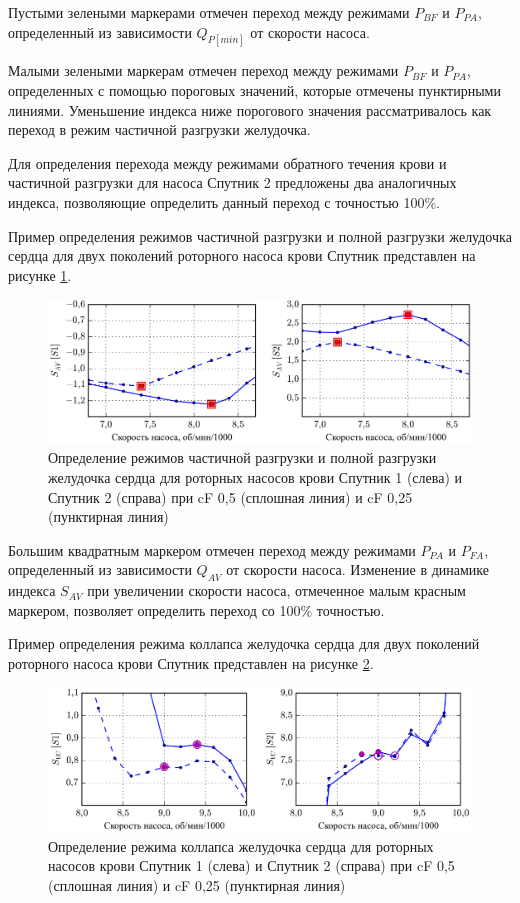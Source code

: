Пустыми зелеными маркерами отмечен переход между режимами $P_{BF}$ и $P_{PA}$, определенный из зависимости $Q_{P[min]}$ от скорости насоса. 

Малыми зелеными маркерам отмечен переход между режимами $P_{BF}$ и $P_{PA}$, определенных с помощью пороговых значений, которые отмечены пунктирными линиями. Уменьшение индекса ниже порогового значения рассматривалось как переход в режим частичной разгрузки желудочка.

Для определения перехода между режимами обратного течения крови и частичной разгрузки для насоса Спутник 2 предложены два аналогичных индекса, позволяющие определить данный переход с точностью 100\%. 

Пример определения режимов частичной разгрузки и полной разгрузки желудочка сердца для двух поколений роторного насоса крови Спутник представлен на рисунке \ref{img:pa_fa_identification}.

\begin{figure}[H] 
  \center
  \includegraphics [scale=1.0] {../images/c4_av}
  \caption{Определение режимов частичной разгрузки и полной разгрузки желудочка сердца для роторных насосов крови Спутник 1 (слева) и Спутник 2 (справа) при cF 0,5 (сплошная линия) и cF 0,25 (пунктирная линия)} 
  \label{img:pa_fa_identification}  
\end{figure}

Большим квадратным маркером отмечен переход между режимами $P_{PA}$ и $P_{FA}$, определенный из зависимости $Q_{AV}$ от скорости насоса. Изменение в динамике индекса $S_{AV}$ при увеличении скорости насоса, отмеченное малым красным маркером, позволяет определить переход со 100\% точностью.  

Пример определения режима коллапса желудочка сердца для двух поколений роторного насоса крови Спутник представлен на рисунке \ref{img:collapse_identification}.

\begin{figure}[H] 
  \center
  \includegraphics [scale=1.0] {../images/c4_vc}
  \caption{Определение режима коллапса желудочка сердца для роторных насосов крови Спутник 1 (слева) и Спутник 2 (справа) при cF 0,5 (сплошная линия) и cF 0,25 (пунктирная линия)} 
  \label{img:collapse_identification}  
\end{figure}

